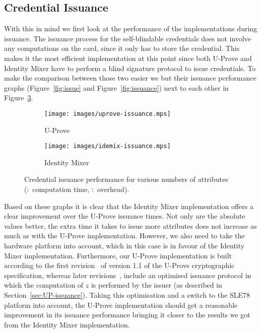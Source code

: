 \subsection{Credential Issuance}

With this in mind we first look at the performance of the implementations during
issuance. The issuance process for the self-blindable credentials does not
involve any computations on the card, since it only has to store the credential.
This makes it the most efficient implementation at this point since both U-Prove
and Identity Mixer have to perform a blind signature protocol to issue
credentials. To make the comparison between those two easier we but their
issuance performance graphs (Figure~\ref{fig:issue} and Figure~\ref{fig:issuance})
next to each other in Figure~\ref{fig:comparison-issuance}.

\begin{figure}[ht]
  \centering
  \begin{subfigure}[b]{0.45\textwidth}
  \texttt{[image: images/uprove-issuance.mps]}
    \caption{U-Prove}
    \label{fig:uprove-issuance}
  \end{subfigure}
  \begin{subfigure}[b]{0.45\textwidth}
  \texttt{[image: images/idemix-issuance.mps]}
    \caption{Identity Mixer}
    \label{fig:idemix-issuance}
  \end{subfigure}

  \caption[Credential issuance performance for various numbers of attributes.]{
    Credential issuance performance for various numbers of attributes
    (:~computation time,
      :~overhead).}
  \label{fig:comparison-issuance}
\end{figure}

Based on these graphs it is clear that the Identity Mixer implementation offers
a clear improvement over the U-Prove issuance times. Not only are the absolute
values better, the extra time it takes to issue more attributes does not
increase as much as with the U-Prove implementation. However, we also need to
take the hardware platform into account, which in this case is in favour of the
Identity Mixer implementation. Furthermore, our U-Prove implementation is built
according to the first revision~\cite{U-Prove_Crypto2011} of version 1.1 of the
U-Prove cryptographic specification, whereas later revisions~\cite{U-Prove_Crypto2013},
include an optimised issuance protocol in which the computation of $z$ is
performed by the issuer (as described in Section~\ref{sec:UP-issuance}). Taking
this optimisation and a switch to the SLE78 platform into account, the U-Prove
implementation should get a reasonable improvement in its issuance performance
bringing it closer to the results we got from the Identity Mixer implementation.

